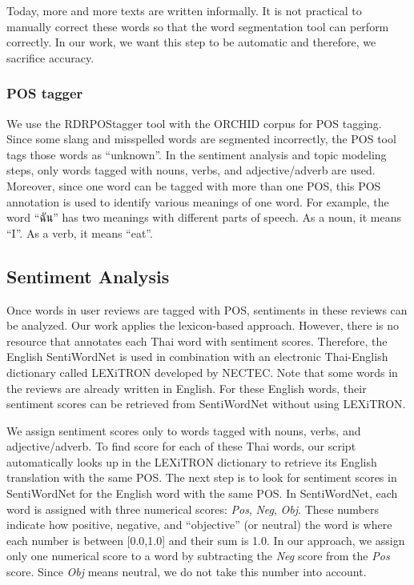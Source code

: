 Today, more and more texts are written informally. It is not practical to manually correct these words so that the word segmentation tool can perform correctly. In our work, we want this step to be automatic and therefore, we sacrifice accuracy. 


\subsubsection{POS tagger}

We use the RDRPOStagger tool\cite{RDRPOSTagger} with the ORCHID corpus\cite{ORCHID} for POS tagging. Since some slang and misspelled words are segmented incorrectly, the POS tool tags those words as \enquote{unknown}. In the sentiment analysis and topic modeling steps, only words tagged with nouns, verbs, and adjective/adverb are used. Moreover, since one word can be tagged with more than one POS, this POS annotation is used to identify various meanings of one word. For example, the word \enquote{{ฉัน}} has two meanings with different parts of speech. As a noun, it means \enquote{I}. As a verb, it means \enquote{eat}.

\subsection{Sentiment Analysis}
Once words in user reviews are tagged with POS, sentiments in these reviews can be analyzed. Our work applies the lexicon-based approach. However, there is no resource that annotates each Thai word with sentiment scores. Therefore, the English SentiWordNet \cite{SentiWordNet} is used in combination with an electronic Thai-English dictionary called LEXiTRON \cite{LEXiTRON} developed by NECTEC. Note that some words in the reviews are already written in English. For these English words, their sentiment scores can be retrieved from SentiWordNet without using LEXiTRON.

We assign sentiment scores only to words tagged with nouns, verbs, and adjective/adverb. To find score for each of these Thai words, our script automatically looks up in the LEXiTRON dictionary to retrieve its English translation with the same POS. The next step is to look for sentiment scores in SentiWordNet for the English word with the same POS. In SentiWordNet, each word is assigned with three numerical scores: \textit{Pos}, \textit{Neg}, \textit{Obj}. These numbers indicate how positive, negative, and \enquote{objective} (or neutral) the word is where each number is between [0.0,1.0] and their sum is 1.0. In our approach, we assign only one numerical score to a word by subtracting the \textit{Neg} score from the \textit{Pos} score. Since \textit{Obj} means neutral, we do not take this number into account.  

